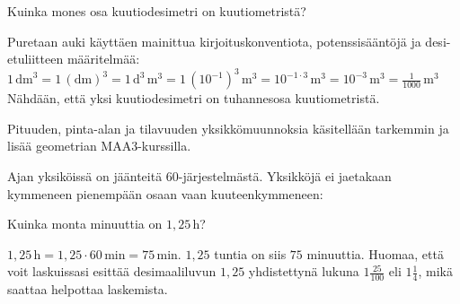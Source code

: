 \begin{esimerkki}
Kuinka mones osa kuutiodesimetri on kuutiometristä?

	\begin{esimratk}
	Puretaan auki käyttäen mainittua kirjoituskonventiota, potenssisääntöjä ja desi-etuliitteen määritelmää:
	$1\,\text{dm}^3=1\,(\text{dm})^3=1\,\text{d}^3\,\text{m}^3=1\,(10^{-1})^3\,\text{m}^3=10^{-1\cdot3}\,\text{m}^3=10^{-3}\,\text{m}^3=\frac{1}{1000}\,\text{m}^3$
	Nähdään, että yksi kuutiodesimetri on tuhannesosa kuutiometristä.
	\end{esimratk}

\end{esimerkki}







Pituuden, pinta-alan ja tilavuuden yksikkömuunnoksia käsitellään tarkemmin ja lisää geometrian MAA3-kurssilla. 

Ajan yksiköissä on jäänteitä 60-järjestelmästä. Yksikköjä ei jaetakaan kymmeneen pienempään osaan vaan kuuteenkymmeneen:


%
%
%
%

\begin{esimerkki}
Kuinka monta minuuttia on $1,25$\,h?

\begin{esimratk}
$1,25\,\text{h} = 1,25 \cdot 60\,\text{min} = 75\,\text{min}$. $1,25$ tuntia on siis $75$ minuuttia. Huomaa, että voit laskuissasi esittää desimaaliluvun $1,25$ yhdistettynä lukuna $1 \frac{25}{100}$ eli $1 \frac{1}{4}$, mikä saattaa helpottaa laskemista.
\end{esimratk}
\end{esimerkki}

